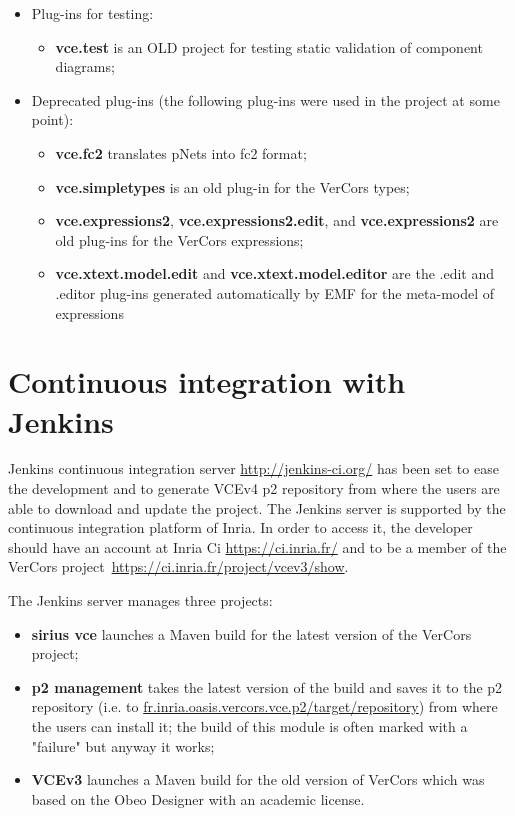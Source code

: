 \documentclass[12pt]{article}
\begin{document}
\begin{itemize}
\item
Plug-ins for testing:
\begin{itemize}
\item
\textbf{vce.test} is an OLD project for testing static validation of component diagrams;
\end{itemize}

\item
Deprecated plug-ins (the following plug-ins were used in the project at some point):
\begin{itemize}
\item
\textbf{vce.fc2} translates pNets into fc2 format;
\item
\textbf{vce.simpletypes} is an old plug-in for the VerCors types;
\item
\textbf{vce.expressions2}, \textbf{vce.expressions2.edit}, and \textbf{vce.expressions2} are old plug-ins for the VerCors expressions;
\item
\textbf{vce.xtext.model.edit} and \textbf{vce.xtext.model.editor} are the .edit and .editor plug-ins generated automatically by EMF for the meta-model of expressions
\end{itemize}
\end{itemize}

\section{Continuous integration with Jenkins}
Jenkins continuous integration server \url{http://jenkins-ci.org/} has been set to ease the development and to generate VCEv4 p2 repository from where the users are able to download and update the project. The Jenkins server is supported by the continuous integration platform of Inria. In order to access it, the developer should have an account at Inria Ci \url{https://ci.inria.fr/} and to be a member of the VerCors project~\url{https://ci.inria.fr/project/vcev3/show}.

The Jenkins server manages three projects:
\begin{itemize}
\item
\textbf{sirius vce} launches a Maven build for the latest version of the VerCors project;
\item
\textbf{p2 management} takes the latest version of the build and saves it to the p2 repository (i.e. to \url{fr.inria.oasis.vercors.vce.p2/target/repository}) from where the users can install it; the build of this module is often marked with a "failure" but anyway it works;
\item
\textbf{VCEv3} launches a Maven build for the old version of VerCors which was based on the Obeo Designer with an academic license.
\end{itemize}
\end{document}
